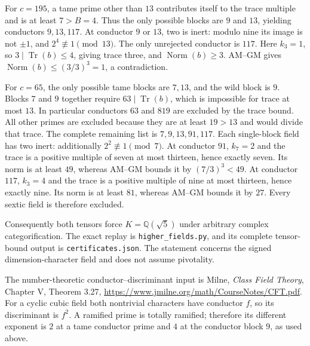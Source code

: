 For $c=195$, a tame prime other than $13$ contributes itself to the trace
multiple and is at least $7>B=4$. Thus the only possible blocks are $9$
and $13$, yielding conductors $9,13,117$. At conductor $9$ or $13$, two
is inert: modulo nine its image is not $\pm1$, and
$2^4\not\equiv1\pmod{13}$. The only unrejected conductor is $117$.
Here $k_3=1$, so $3\mid\operatorname{Tr}(b)\le4$, giving trace three,
and $\operatorname{Norm}(b)\ge3$. AM--GM gives
$\operatorname{Norm}(b)\le(3/3)^3=1$, a contradiction.

For $c=65$, the only possible tame blocks are $7,13$, and the wild block
is $9$. Blocks $7$ and $9$ together require $63\mid\operatorname{Tr}(b)$,
which is impossible for trace at most $13$. In particular conductors $63$
and $819$ are excluded by the trace bound. All other primes are excluded
because they are at least $19>13$ and would divide that trace.
The complete remaining list is $7,9,13,91,117$. Each single-block field
has two inert: additionally $2^2\not\equiv1\pmod7$.
At conductor $91$, $k_7=2$ and the trace is a positive multiple of seven
at most thirteen, hence exactly seven. Its norm is at least $49$, whereas
AM--GM bounds it by $(7/3)^3<49$. At conductor $117$, $k_3=4$ and the trace
is a positive multiple of nine at most thirteen, hence exactly nine.
Its norm is at least $81$, whereas AM--GM bounds it by $27$.
Every sextic field is therefore excluded.

Consequently both tensors force $K=\mathbb Q(\sqrt5)$ under arbitrary
complex categorification. The exact replay is
\texttt{higher\_fields.py}, and its complete tensor-bound output is
\texttt{certificates.json}. The statement concerns the
signed dimension-character field and does not assume pivotality.

The number-theoretic conductor--discriminant input is Milne,
\emph{Class Field Theory}, Chapter V, Theorem 3.27,
\url{https://www.jmilne.org/math/CourseNotes/CFT.pdf}.
For a cyclic cubic field both nontrivial characters have conductor $f$,
so its discriminant is $f^2$. A ramified prime is totally ramified;
therefore its different exponent is $2$ at a tame conductor prime and
$4$ at the conductor block $9$, as used above.
